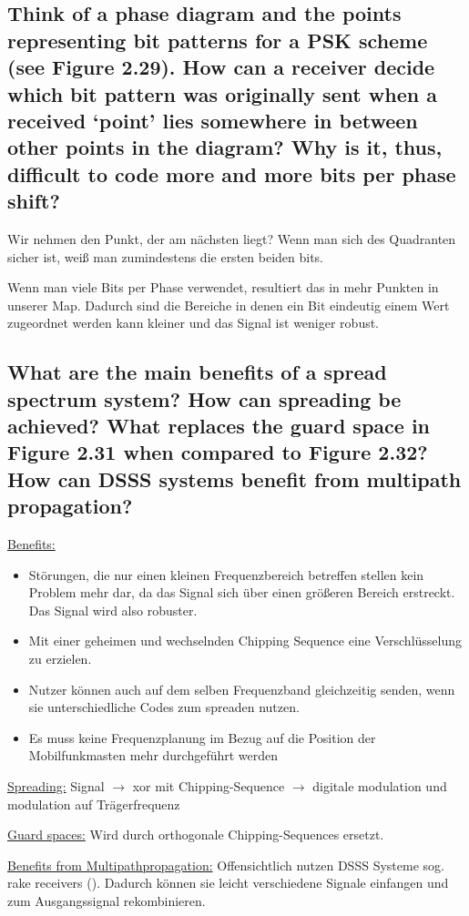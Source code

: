 \subsection{Think of a phase diagram and the points representing bit patterns for a PSK scheme
(see Figure 2.29). How can a receiver decide which bit pattern was originally sent
when a received ‘point’ lies somewhere in between other points in the diagram? Why
is it, thus, difficult to code more and more bits per phase shift?}
Wir nehmen den Punkt, der am nächsten liegt? Wenn man sich des Quadranten sicher ist, weiß man zumindestens die ersten beiden bits.

Wenn man viele Bits per Phase verwendet, resultiert das in mehr Punkten in unserer Map. Dadurch sind die Bereiche in denen ein Bit eindeutig einem Wert zugeordnet werden kann kleiner und das Signal ist weniger robust.


\subsection{What are the main benefits of a spread spectrum system? How can spreading be
achieved? What replaces the guard space in Figure 2.31 when compared to Figure
2.32? How can DSSS systems benefit from multipath propagation?}
\underline{Benefits:}
\begin{itemize}
\item Störungen, die nur einen kleinen Frequenzbereich betreffen stellen kein Problem mehr dar, da das Signal sich über einen größeren Bereich erstreckt. Das Signal wird also robuster.
\item Mit einer geheimen und wechselnden Chipping Sequence eine Verschlüsselung zu erzielen.
\item Nutzer können auch auf dem selben Frequenzband gleichzeitig senden, wenn sie unterschiedliche Codes zum spreaden nutzen.
\item Es muss keine Frequenzplanung im Bezug auf die Position der Mobilfunkmasten mehr durchgeführt werden
\end{itemize}

\underline{Spreading:} Signal $\rightarrow$ xor mit Chipping-Sequence $\rightarrow$ digitale modulation und modulation auf Trägerfrequenz

\underline{Guard spaces:} Wird durch orthogonale Chipping-Sequences ersetzt.

\underline{Benefits from Multipathpropagation:} Offensichtlich nutzen DSSS Systeme sog. rake receivers (). Dadurch können sie leicht verschiedene Signale einfangen und zum Ausgangssignal rekombinieren.


